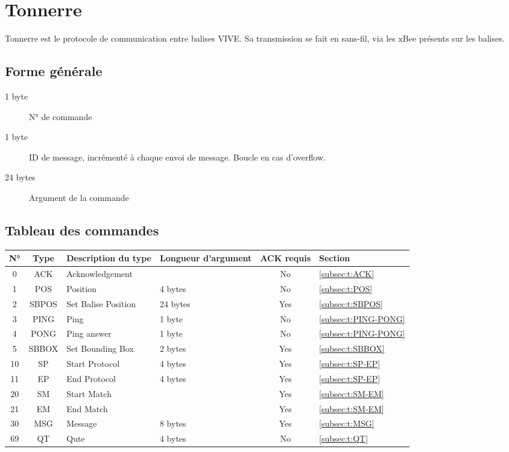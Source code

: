 ﻿\section{Tonnerre}

Tonnerre est le protocole de communication entre balises VIVE.
Sa transmission se fait en sans-fil, via les xBee présents sur les balises.

\subsection{Forme générale}

\begin{description}
	\item[1 byte] N° de commande
	\item[1 byte] ID de message, incrémenté à chaque envoi de message. Boucle en cas d'overflow.
	\item[24 bytes] Argument de la commande
\end{description}

\subsection{Tableau des commandes}

\begin{tabular}{|c|c|l|l|c|l|}

\hline
N° & Type  & Description du type & Longueur d'argument & ACK requis & Section \\
\hline
0  & ACK   & Acknowledgement     &          & No & \ref{subsec:t:ACK} \\
\hline
1  & POS   & Position            & 4 bytes  & No & \ref{subsec:t:POS} \\
2  & SBPOS & Set Balise Position & 24 bytes & Yes & \ref{subsec:t:SBPOS} \\
\hline
3  & PING  & Ping                & 1 byte   & No & \ref{subsec:t:PING-PONG} \\
4  & PONG  & Ping answer         & 1 byte   & No & \ref{subsec:t:PING-PONG} \\
\hline
5  & SBBOX & Set Bounding Box    & 2 bytes  & Yes & \ref{subsec:t:SBBOX} \\
\hline
10 & SP    & Start Protocol      & 4 bytes  & Yes & \ref{subsec:t:SP-EP} \\
11 & EP    & End Protocol        & 4 bytes  & Yes & \ref{subsec:t:SP-EP} \\
\hline
20 & SM    & Start Match         &          & Yes & \ref{subsec:t:SM-EM} \\
21 & EM    & End Match           &          & Yes & \ref{subsec:t:SM-EM} \\
\hline
30 & MSG   & Message             & 8 bytes  & Yes & \ref{subsec:t:MSG} \\
\hline
69 & QT    & Qute                & 4 bytes  & No & \ref{subsec:t:QT} \\
\hline

\end{tabular}

